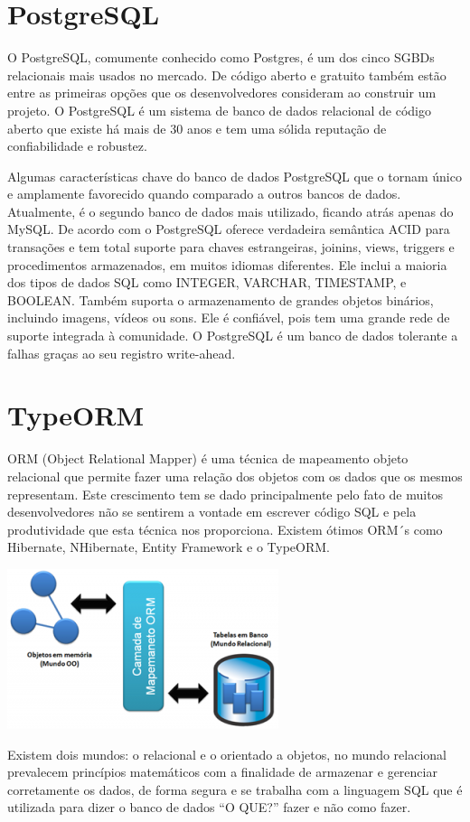 \section{PostgreSQL}
O PostgreSQL, comumente conhecido como Postgres, é um dos cinco SGBDs relacionais mais usados no mercado. De código aberto e gratuito também estão entre as primeiras opções que os desenvolvedores consideram ao construir um projeto. O PostgreSQL é um sistema de banco de dados relacional de código aberto que existe há mais de 30 anos e tem uma sólida reputação de confiabilidade e robustez. \cite{postgresql}

Algumas características chave do banco de dados PostgreSQL que o tornam único e amplamente favorecido quando comparado a outros bancos de dados. Atualmente, é o segundo banco de dados mais utilizado, ficando atrás apenas do MySQL. De acordo com  o PostgreSQL oferece verdadeira semântica ACID para transações e tem total suporte para chaves estrangeiras, joinins, views, triggers e procedimentos armazenados, em muitos idiomas diferentes. Ele inclui a maioria dos tipos de dados SQL como INTEGER, VARCHAR, TIMESTAMP, e BOOLEAN. Também suporta o armazenamento de grandes objetos binários, incluindo imagens, vídeos ou sons. Ele é confiável, pois tem uma grande rede de suporte integrada à comunidade. O PostgreSQL é um banco de dados tolerante a falhas graças ao seu registro write-ahead.

\section{TypeORM}
ORM (Object Relational Mapper) é uma técnica de mapeamento objeto relacional que permite fazer uma relação dos objetos com os dados que os mesmos representam. Este crescimento tem se dado principalmente pelo fato de muitos desenvolvedores não se sentirem a vontade em escrever código SQL e pela produtividade que esta técnica nos proporciona. Existem ótimos ORM´s como Hibernate, NHibernate, Entity Framework e o TypeORM.

\begin{center}
\includegraphics[scale=0.5]{imagens/orm.png}
\end{center}
Existem dois mundos: o relacional e o orientado a objetos, no mundo relacional prevalecem princípios matemáticos com a finalidade de armazenar e gerenciar corretamente os dados, de forma segura e se trabalha com a linguagem SQL que é utilizada para dizer o banco de dados “O QUE?” fazer e não como fazer.

